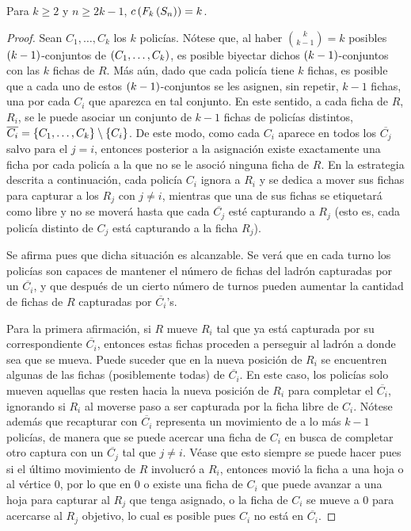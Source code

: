 \begin{teorema}
\label{teo:numero-de-policia-estrella}
    Para $k\geq 2$ y $n\geq 2k-1$, $c\left( F_{k}\left( S_{n}\right)\right)=k$.
\end{teorema}

\begin{proof}
    Sean $C_1,\dots, C_k$ los $k$ polic\'ias. N\'otese que, al haber
    $\binom{k}{k-1}=k$ posibles $\left( k-1\right)$-conjuntos de $\left( C_1,\dots,
    C_k\right)$, es posible biyectar dichos $\left( k-1\right)$-conjuntos con las $k$ fichas
    de $R$. M\'as a\'un, dado que cada polic\'ia tiene $k$ fichas, es posible
    que a cada uno de estos $\left( k-1\right)$-conjuntos se les asignen, sin repetir,
    $k-1$ fichas, una por cada $C_i$ que aparezca en tal conjunto. En este
    sentido, a cada ficha de $R$, $R_i$, se le puede asociar un conjunto de
    $k-1$ fichas de polic\'ias distintos,
    $\overline{C_i}=\left\{ C_1,\dots,C_k\right\}\setminus\left\{ C_i\right\}$. De este modo, como cada
    $C_i$ aparece en todos los $\overline{C_j}$ salvo para el $j=i$, entonces
    posterior a la asignaci\'on existe exactamente una ficha por cada polic\'ia
    a la que no se le asoci\'o ninguna ficha de $R$. En la estrategia descrita a
    continuaci\'on, cada polic\'ia $C_i$ ignora a $R_i$ y se dedica a mover sus
    fichas para capturar a los $R_j$ con $j\neq i$, mientras que una de sus
    fichas se etiquetar\'a como libre y no se mover\'a hasta que cada
    $\overline{C_j}$ est\'e capturando a $R_j$ (esto es, cada polic\'ia distinto
    de $C_j$ est\'a capturando a la ficha $R_j$).

    Se afirma pues que dicha situaci\'on es alcanzable. Se ver\'a que en cada
    turno los polic\'ias son capaces de mantener el n\'umero de fichas del
    ladr\'on capturadas por un $\overline{C_i}$, y que despu\'es de un cierto
    n\'umero de turnos pueden aumentar la cantidad de fichas de $R$ capturadas
    por $\overline{C_i}$'s.

    Para la primera afirmaci\'on, si $R$ mueve $R_i$ tal que ya est\'a capturada
    por su correspondiente $\overline{C_i}$, entonces estas fichas proceden a
    perseguir al ladr\'on a donde sea que se mueva. Puede suceder que en la
    nueva posici\'on de $R_i$ se encuentren algunas de las fichas (posiblemente
    todas) de $\overline{C_i}$. En este caso, los polic\'ias solo mueven
    aquellas que resten hacia la nueva posici\'on de $R_i$ para completar el
    $\overline{C_i}$, ignorando si $R_i$ al moverse paso a ser capturada por la
    ficha libre de $C_i$. N\'otese adem\'as que recapturar con $\overline{C_i}$
    representa un movimiento de a lo m\'as $k-1$ polic\'ias, de manera que se
    puede acercar una ficha de $C_i$ en busca de completar otro captura con un
    $\overline{C_j}$ tal que $j\neq i$. V\'ease que esto siempre se puede hacer
    pues si el \'ultimo movimiento de $R$ involucr\'o a $R_i$, entonces movi\'o
    la ficha a una hoja o al v\'ertice $0$, por lo que en $0$ o existe una ficha
    de $C_i$ que puede avanzar a una hoja para capturar al $R_j$ que tenga
    asignado, o la ficha de $C_i$ se mueve a $0$ para acercarse al $R_j$
    objetivo, lo cual es posible pues $C_i$ no est\'a en $\overline{C_i}$.
    

\end{proof}
